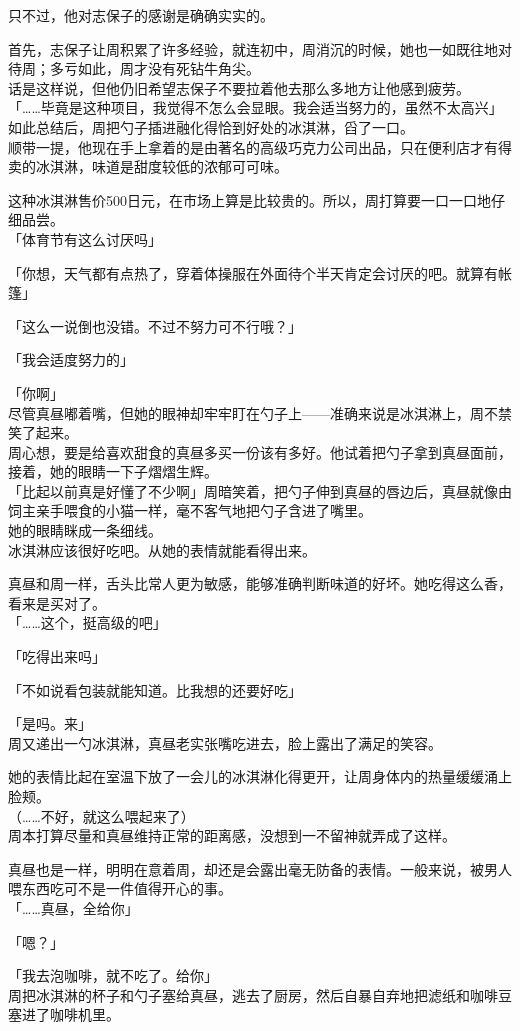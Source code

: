 只不过，他对志保子的感谢是确确实实的。

首先，志保子让周积累了许多经验，就连初中，周消沉的时候，她也一如既往地对待周；多亏如此，周才没有死钻牛角尖。\\

话是这样说，但他仍旧希望志保子不要拉着他去那么多地方让他感到疲劳。\\

「……毕竟是这种项目，我觉得不怎么会显眼。我会适当努力的，虽然不太高兴」\\

如此总结后，周把勺子插进融化得恰到好处的冰淇淋，舀了一口。\\

顺带一提，他现在手上拿着的是由著名的高级巧克力公司出品，只在便利店才有得卖的冰淇淋，味道是甜度较低的浓郁可可味。

这种冰淇淋售价500日元，在市场上算是比较贵的。所以，周打算要一口一口地仔细品尝。\\

「体育节有这么讨厌吗」

「你想，天气都有点热了，穿着体操服在外面待个半天肯定会讨厌的吧。就算有帐篷」

「这么一说倒也没错。不过不努力可不行哦？」

「我会适度努力的」

「你啊」\\

尽管真昼嘟着嘴，但她的眼神却牢牢盯在勺子上——准确来说是冰淇淋上，周不禁笑了起来。\\

周心想，要是给喜欢甜食的真昼多买一份该有多好。他试着把勺子拿到真昼面前，接着，她的眼睛一下子熠熠生辉。\\

「比起以前真是好懂了不少啊」周暗笑着，把勺子伸到真昼的唇边后，真昼就像由饲主亲手喂食的小猫一样，毫不客气地把勺子含进了嘴里。\\

她的眼睛眯成一条细线。\\

冰淇淋应该很好吃吧。从她的表情就能看得出来。

真昼和周一样，舌头比常人更为敏感，能够准确判断味道的好坏。她吃得这么香，看来是买对了。\\

「……这个，挺高级的吧」

「吃得出来吗」

「不如说看包装就能知道。比我想的还要好吃」

「是吗。来」\\

周又递出一勺冰淇淋，真昼老实张嘴吃进去，脸上露出了满足的笑容。

她的表情比起在室温下放了一会儿的冰淇淋化得更开，让周身体内的热量缓缓涌上脸颊。\\

（……不好，就这么喂起来了）\\

周本打算尽量和真昼维持正常的距离感，没想到一不留神就弄成了这样。

真昼也是一样，明明在意着周，却还是会露出毫无防备的表情。一般来说，被男人喂东西吃可不是一件值得开心的事。\\

「……真昼，全给你」

「嗯？」

「我去泡咖啡，就不吃了。给你」\\

周把冰淇淋的杯子和勺子塞给真昼，逃去了厨房，然后自暴自弃地把滤纸和咖啡豆塞进了咖啡机里。
